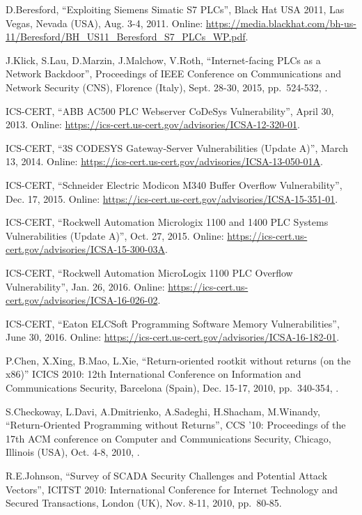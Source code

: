 \begin{thebibliography}{99}
D.Beresford,
``Exploiting Siemens Simatic S7 PLCs'',
Black Hat USA 2011,
Las Vegas, Nevada (USA), Aug. 3-4, 2011.
Online: \url{https://media.blackhat.com/bh-us-11/Beresford/BH_US11_Beresford_S7_PLCs_WP.pdf}.

J.Klick, S.Lau, D.Marzin, J.Malchow, V.Roth,
``Internet-facing PLCs as a Network Backdoor'',
Proceedings of IEEE Conference on Communications and Network Security (CNS),
Florence (Italy), Sept. 28-30, 2015,
pp.\ 524-532,
.

ICS-CERT,
``ABB AC500 PLC Webserver CoDeSys Vulnerability'',
April 30, 2013.
Online: \url{https://ics-cert.us-cert.gov/advisories/ICSA-12-320-01}.

ICS-CERT,
``3S CODESYS Gateway-Server Vulnerabilities (Update A)'',
March 13, 2014.
Online: \url{https://ics-cert.us-cert.gov/advisories/ICSA-13-050-01A}.

ICS-CERT,
``Schneider Electric Modicon M340 Buffer Overflow Vulnerability'',
Dec. 17, 2015.
Online: \url{https://ics-cert.us-cert.gov/advisories/ICSA-15-351-01}.

ICS-CERT,
``Rockwell Automation Micrologix 1100 and 1400 PLC Systems Vulnerabilities (Update A)'',
Oct. 27, 2015.
Online: \url{https://ics-cert.us-cert.gov/advisories/ICSA-15-300-03A}.

ICS-CERT,
``Rockwell Automation MicroLogix 1100 PLC Overflow Vulnerability'',
Jan. 26, 2016.
Online: \url{https://ics-cert.us-cert.gov/advisories/ICSA-16-026-02}.

ICS-CERT,
``Eaton ELCSoft Programming Software Memory Vulnerabilities'',
June 30, 2016.
Online: \url{https://ics-cert.us-cert.gov/advisories/ICSA-16-182-01}.

P.Chen, X.Xing, B.Mao, L.Xie,
``Return-oriented rootkit without returns (on the x86)''
ICICS 2010: 12th International Conference on Information and Communications Security,
Barcelona (Spain), Dec. 15-17, 2010,
pp.\ 340-354,
.

S.Checkoway, L.Davi, A.Dmitrienko, A.Sadeghi, H.Shacham, M.Winandy,
``Return-Oriented Programming without Returns'',
CCS '10: Proceedings of the 17th ACM conference on Computer and Communications Security,
Chicago, Illinois (USA), Oct. 4-8, 2010,
.

R.E.Johnson,
``Survey of SCADA Security Challenges and Potential Attack Vectors'',
ICITST 2010: International Conference for Internet Technology and Secured Transactions,
London (UK), Nov. 8-11, 2010,
pp.\ 80-85.


\end{thebibliography}
